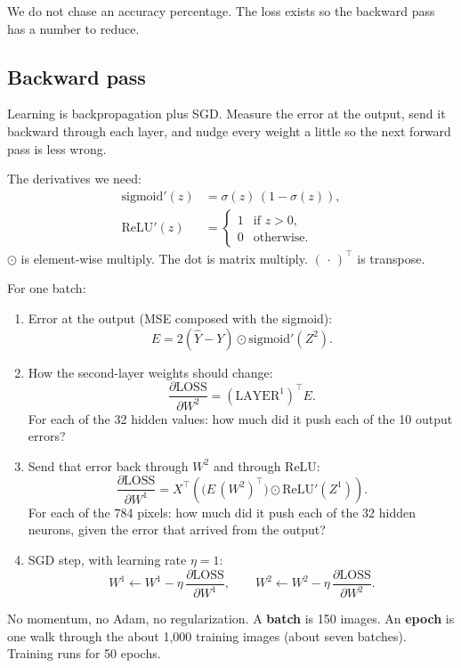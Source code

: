 \documentclass[11pt]{article}
\begin{document}
We do not chase an accuracy percentage. The loss exists so the backward pass has a number to reduce.

\subsection*{Backward pass}

Learning is backpropagation plus SGD. Measure the error at the output, send it backward through each layer, and nudge every weight a little so the next forward pass is less wrong.

The derivatives we need:
\begin{align*}
\mathrm{sigmoid}'(z) &= \sigma(z)\,(1-\sigma(z)), \\
\mathrm{ReLU}'(z) &=
  \begin{cases}
    1 & \text{if } z>0,\\
    0 & \text{otherwise.}
  \end{cases}
\end{align*}
$\odot$ is element-wise multiply. The dot is matrix multiply. $(\,\cdot\,)^{\!\top}$ is transpose.

For one batch:
\begin{enumerate}
  \item Error at the output (MSE composed with the sigmoid):
  \[
    E = 2(\hat{Y}-Y)\odot \mathrm{sigmoid}'(Z^{2}).
  \]
  \item How the second-layer weights should change:
  \[
    \frac{\partial \mathrm{LOSS}}{\partial W^{2}} = (\mathrm{LAYER}^{1})^{\!\top} E.
  \]
  For each of the 32 hidden values: how much did it push each of the 10 output errors?
  \item Send that error back through $W^{2}$ and through ReLU:
  \[
    \frac{\partial \mathrm{LOSS}}{\partial W^{1}}
      = X^{\!\top}\!\left(\bigl(E\,(W^{2})^{\!\top}\bigr)\odot \mathrm{ReLU}'(Z^{1})\right).
  \]
  For each of the 784 pixels: how much did it push each of the 32 hidden neurons, given the error that arrived from the output?
  \item SGD step, with learning rate $\eta=1$:
  \[
    W^{1} \leftarrow W^{1}-\eta\,\frac{\partial \mathrm{LOSS}}{\partial W^{1}},
    \qquad
    W^{2} \leftarrow W^{2}-\eta\,\frac{\partial \mathrm{LOSS}}{\partial W^{2}}.
  \]
\end{enumerate}

No momentum, no Adam, no regularization. A \textbf{batch} is 150 images. An \textbf{epoch} is one walk through the about 1{,}000 training images (about seven batches). Training runs for 50 epochs.
\end{document}

